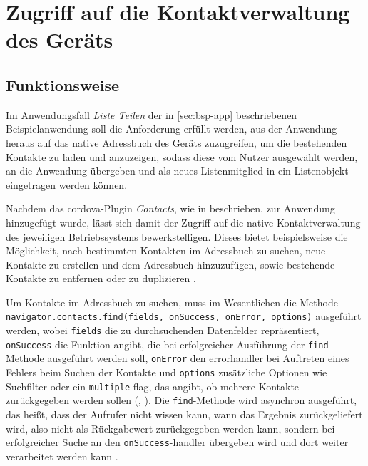 
		
\section{Zugriff auf die Kontaktverwaltung des Geräts} \label{sec:contacts}

\subsection{Funktionsweise}

Im Anwendungsfall \emph{Liste Teilen} der in \autoref{sec:bsp-app} beschriebenen Beispielanwendung  soll die Anforderung erfüllt werden, aus der Anwendung heraus auf das native Adressbuch des Geräts zuzugreifen, um die bestehenden Kontakte zu laden und anzuzeigen, sodass diese vom Nutzer ausgewählt werden, an die Anwendung übergeben und als neues Listenmitglied in ein Listenobjekt eingetragen werden können.

Nachdem das \gls{cordova}-Plugin \emph{Contacts}, wie in  beschrieben, zur Anwendung hinzugefügt wurde, lässt sich damit der Zugriff auf die native Kontaktverwaltung des jeweiligen Betriebssystems bewerkstelligen.
Dieses bietet beispielsweise die Möglichkeit, nach bestimmten Kontakten im Adressbuch zu suchen, neue Kontakte zu erstellen und dem Adressbuch hinzuzufügen, sowie bestehende Kontakte zu entfernen oder zu duplizieren \cite{Cordova_Plugin_Registry_Contacts}.

Um Kontakte im Adressbuch zu suchen, muss im Wesentlichen die Methode \lstinline|navigator.contacts.find(fields, onSuccess, onError, options)| ausgeführt werden, wobei \lstinline|fields| die zu durchsuchenden Datenfelder repräsentiert, \lstinline|onSuccess| die Funktion angibt, die bei erfolgreicher Ausführung der \lstinline|find|-Methode ausgeführt werden soll, \lstinline|onError| den \gls{errorhandler} bei Auftreten eines Fehlers beim Suchen der Kontakte und \lstinline|options| zusätzliche Optionen wie Suchfilter oder ein \lstinline|multiple|-\gls{flag}, das angibt, ob mehrere Kontakte zurückgegeben werden sollen (, ).
Die \lstinline|find|-Methode wird \gls{asynchron} ausgeführt, das heißt, dass der Aufrufer nicht wissen kann, wann das Ergebnis zurückgeliefert wird, also nicht als Rückgabewert zurückgegeben werden kann, sondern bei erfolgreicher Suche an den \og \lstinline|onSuccess|-\gls{handler} übergeben wird und dort weiter verarbeitet werden kann \cite{Cordova_Plugin_Registry_Contacts}.


